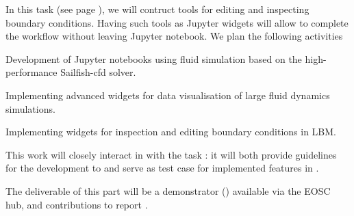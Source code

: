 \begin{task}[
  title=Demonstrator: Visualisation and control of fluid dynamics in Jupyter notebook,
  id=application-gpu,
  lead=SIL,
  PM=12,
  wphases={4-36},
  partners={EGI}
]


In this task (see page \pageref{sec:concept-demonstrator-gpu}), we will contruct tools for editing and inspecting
boundary conditions. Having such tools as Jupyter widgets will allow
to complete the workflow without leaving Jupyter notebook. We plan the
following activities
\begin{compactitem}
\item Development of Jupyter notebooks using fluid
  simulation based on the high-performance Sailfish-cfd solver.
\item Implementing advanced widgets for data visualisation of large
  fluid dynamics simulations.
\item Implementing widgets for inspection and editing boundary
  conditions in LBM.
\end{compactitem}

This work will closely interact in with the task
: it will both provide guidelines
for the development to  and serve
as test case for implemented features in
.

The deliverable of this part will be a demonstrator
() available via the EOSC hub, and
contributions to report .

\end{task}
